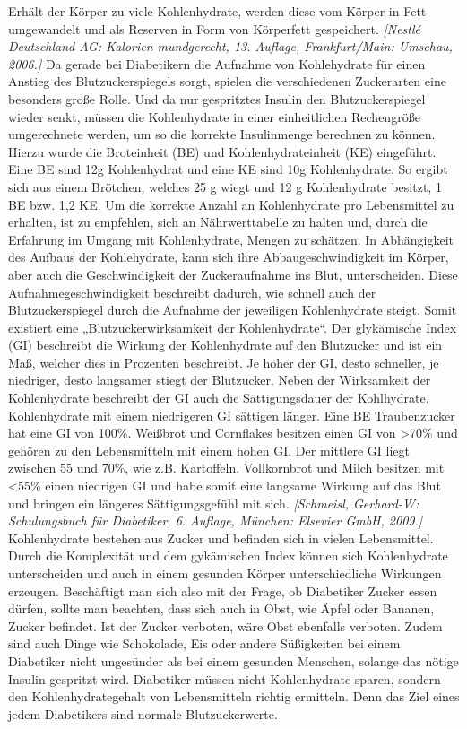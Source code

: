 \documentclass[a4paper,11pt]{article}%
\renewcommand{\\}{\vspace*{0.5\baselineskip} \newline}
\begin{document}
		Erhält der Körper zu viele Kohlenhydrate, werden diese vom Körper in Fett umgewandelt und als Reserven in Form von Körperfett gespeichert. \emph{[Nestlé Deutschland AG: Kalorien mundgerecht, 13. Auflage, Frankfurt/Main: Umschau, 2006.]} \newline
		Da gerade bei Diabetikern die Aufnahme von Kohlehydrate für einen Anstieg des Blutzuckerspiegels sorgt, spielen die verschiedenen Zuckerarten eine besonders große Rolle. Und da nur gespritztes Insulin den Blutzuckerspiegel wieder senkt, müssen die Kohlenhydrate in einer einheitlichen Rechengröße umgerechnete werden, um so die korrekte Insulinmenge berechnen zu können. Hierzu wurde die Broteinheit (BE) und Kohlenhydrateinheit (KE) eingeführt. Eine BE sind 12g Kohlenhydrat und eine KE sind 10g Kohlenhydrate. So ergibt sich aus einem Brötchen, welches 25 g wiegt und 12 g Kohlenhydrate besitzt, 1 BE bzw. 1,2 KE. Um die korrekte Anzahl an Kohlenhydrate pro Lebensmittel zu erhalten, ist zu empfehlen, sich an Nährwerttabelle zu halten und, durch die Erfahrung im Umgang mit Kohlenhydrate, Mengen zu schätzen.\newline
		In Abhängigkeit des Aufbaus der Kohlehydrate, kann sich ihre Abbaugeschwindigkeit im Körper, aber auch die Geschwindigkeit der Zuckeraufnahme ins Blut, unterscheiden. Diese Aufnahmegeschwindigkeit beschreibt dadurch, wie schnell auch der Blutzuckerspiegel durch die Aufnahme der jeweiligen Kohlenhydrate steigt. Somit existiert eine „Blutzuckerwirksamkeit der Kohlenhydrate“. Der glykämische Index (GI) beschreibt die Wirkung der Kohlenhydrate auf den Blutzucker und ist ein Maß, welcher dies in Prozenten beschreibt. Je höher der GI, desto schneller, je niedriger, desto langsamer stiegt der Blutzucker. Neben der Wirksamkeit der Kohlenhydrate beschreibt der GI auch die Sättigungsdauer der Kohlhydrate. Kohlenhydrate mit einem niedrigeren GI sättigen länger. \newline
		Eine BE Traubenzucker hat eine GI von 100\%. Weißbrot und Cornflakes besitzen einen GI von >70\% und gehören zu den Lebensmitteln mit einem hohen GI. Der mittlere GI liegt zwischen 55 und 70\%, wie z.B. Kartoffeln. Vollkornbrot und Milch besitzen mit <55\% einen niedrigen GI und habe somit eine langsame Wirkung auf das Blut und bringen ein längeres Sättigungsgefühl mit sich. \emph{[Schmeisl, Gerhard-W: Schulungsbuch für Diabetiker, 6. Auflage, München: Elsevier GmbH, 2009.]}\\
		Kohlenhydrate bestehen aus Zucker und befinden sich in vielen Lebensmittel. Durch die Komplexität und dem gykämischen Index können sich Kohlenhydrate unterscheiden und auch in einem gesunden Körper unterschiedliche Wirkungen erzeugen. Beschäftigt man sich also mit der Frage, ob Diabetiker Zucker essen dürfen, sollte man beachten, dass sich auch in Obst, wie Äpfel oder Bananen, Zucker befindet. Ist der Zucker verboten, wäre Obst ebenfalls verboten. Zudem sind auch Dinge wie Schokolade, Eis oder andere Süßigkeiten bei einem Diabetiker nicht ungesünder als bei einem gesunden Menschen, solange das nötige Insulin gespritzt wird. Diabetiker müssen nicht Kohlenhydrate sparen, sondern den Kohlenhydrategehalt von Lebensmitteln richtig ermitteln. Denn das Ziel eines jedem Diabetikers sind normale Blutzuckerwerte.
\end{document}
